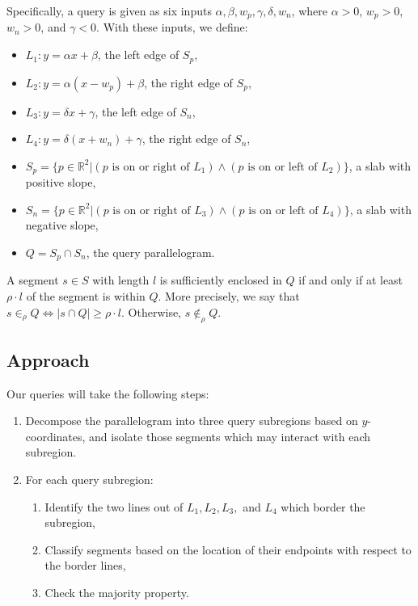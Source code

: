 Specifically, a query is given as six inputs $\alpha, \beta, w_p, \gamma, \delta, w_n$, where $\alpha > 0$, $w_p > 0$, $w_n > 0$, and $\gamma < 0$. With these inputs, we define:

\begin{itemize}
 \item $L_1 : y = \alpha x + \beta$, the left edge of $S_p$,

 \item $L_2 : y = \alpha (x - w_p) + \beta$, the right edge of $S_p$,

 \item $L_3 : y = \delta x + \gamma$, the left edge of $S_n$,

 \item $L_4 : y = \delta (x + w_n) + \gamma$, the right edge of $S_n$,

 \item $S_p = \{ p \in \mathbb{R}^2 | (p \text{ is on or right of } L_1) \wedge (p \text{ is on or left of } L_2) \}$, a slab with positive slope,

 \item $S_n = \{ p \in \mathbb{R}^2 | (p \text{ is on or right of } L_3) \wedge (p \text{ is on or left of } L_4) \}$, a slab with negative slope,

 \item $Q = S_p \cap S_n$, the query parallelogram.

\end{itemize}

A segment $s \in S$ with length $l$ is sufficiently enclosed in $Q$ if and only if at least $\rho \cdot l$ of the segment is within $Q$. More precisely, we say that $s \in_\rho Q \Leftrightarrow |s \cap Q| \geq \rho \cdot l$. Otherwise, $s \not \in_\rho Q$.


\subsection{Approach}
\label{:slabs:two:approach}

Our queries will take the following steps:

\begin{enumerate}
 \item Decompose the parallelogram into three query subregions based on $y$-coordinates, and  isolate those segments which may interact with each subregion.

 \item For each query subregion:
 \begin{enumerate}
  \item Identify the two lines out of $L_1, L_2, L_3,$ and $L_4$ which border the subregion,
  \item Classify segments based on the location of their endpoints with respect to the border lines,
  \item Check the majority property.
 \end{enumerate}
\end{enumerate}

